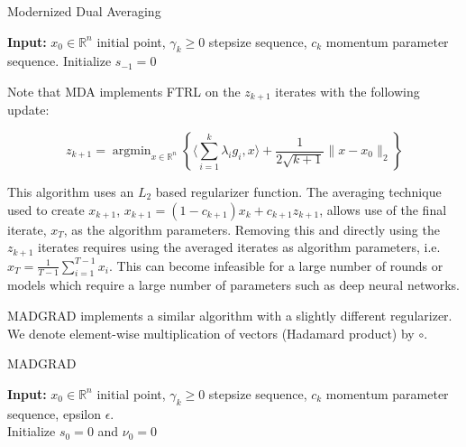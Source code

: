 \documentclass{article}
\newcommand{\R}{\mathbb{R}}
\newcommand{\argmin}{\mathop{\text{argmin}}}
\begin{document}
\begin{algorithm}
  \caption{Modernized Dual Averaging}\label{algo:mda}
  \textbf{Input:} $x_0 \in \R^n$ initial point, $\gamma_k \geq 0$ stepsize sequence, $c_k$ momentum parameter
  sequence. Initialize $s_{-1} = 0$ \\
\end{algorithm}

Note that MDA implements FTRL on the $z_{k+1}$ iterates with the following update:

\[
  z_{k+1} = \argmin_{x \in \R^n}\left\{\langle \sum\limits_{i=1}^{k}\lambda_i g_i, x \rangle + \frac{1}{2\sqrt{k+1}}\|x
  - x_0\|_2\right\}
\]

This algorithm uses an $L_2$ based regularizer function. The averaging technique used to create $x_{k+1}$, $x_{k+1} = (1
- c_{k+1})x_k + c_{k+1}z_{k+1}$, allows use of the final iterate, $x_T$, as the algorithm parameters. Removing this and
directly using the $z_{k+1}$ iterates requires using the averaged iterates as algorithm parameters, i.e. $x_T =
\frac{1}{T-1}\sum_{i=1}^{T-1} x_i$. This can become infeasible for a large number of rounds or models which require a
large number of parameters such as deep neural networks.

MADGRAD implements a similar algorithm with a slightly different regularizer. We denote element-wise multiplication of
vectors (Hadamard product) by $\circ$.

\begin{algorithm}
  \caption{MADGRAD}\label{algo:madgrad}
  \textbf{Input:} $x_0 \in \R^n$ initial point, $\gamma_k \geq 0$ stepsize sequence, $c_k$ momentum parameter
  sequence, epsilon $\epsilon$. \\
  Initialize $s_0= 0$ and $\nu_0 = 0$ \\
\end{algorithm}
\end{document}
